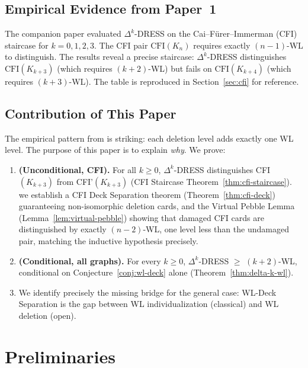 \documentclass[11pt,a4paper]{article}
\begin{document}
\subsection{Empirical Evidence from Paper~1}

The companion paper \cite{castrillo2026dress} evaluated $\Delta^k$-DRESS on the Cai--F\"urer--Immerman (CFI) staircase \cite{cai1992optimal} for $k = 0, 1, 2, 3$. The CFI pair $\text{CFI}(K_n)$ requires exactly $(n{-}1)$-WL to distinguish. The results reveal a precise staircase: $\Delta^k$-DRESS distinguishes $\text{CFI}(K_{k+3})$ (which requires $(k{+}2)$-WL) but fails on $\text{CFI}(K_{k+4})$ (which requires $(k{+}3)$-WL). The table is reproduced in Section~\ref{sec:cfi} for reference.

\subsection{Contribution of This Paper}

The empirical pattern from \cite{castrillo2026dress} is striking: each deletion level adds exactly one WL level. The purpose of this paper is to explain \emph{why}. We prove:

\begin{enumerate}
    \item \textbf{(Unconditional, CFI).} For all $k \geq 0$, $\Delta^k$-DRESS distinguishes CFI$(K_{k+3})$ from CFI'$(K_{k+3})$ (CFI Staircase Theorem~\ref{thm:cfi-staircase}). we establish a CFI Deck Separation theorem (Theorem~\ref{thm:cfi-deck}) guaranteeing non-isomorphic deletion cards, and the Virtual Pebble Lemma (Lemma~\ref{lem:virtual-pebble}) showing that damaged CFI cards are distinguished by exactly $(n{-}2)$-WL, one level less than the undamaged pair, matching the inductive hypothesis precisely.
    \item \textbf{(Conditional, all graphs).} For every $k \geq 0$, $\Delta^k$-DRESS $\geq$ $(k{+}2)$-WL, conditional on Conjecture~\ref{conj:wl-deck} alone (Theorem~\ref{thm:delta-k-wl}).
    \item We identify precisely the missing bridge for the general case: WL-Deck Separation is the gap between WL individualization (classical) and WL deletion (open).
\end{enumerate}

\section{Preliminaries}
\end{document}
